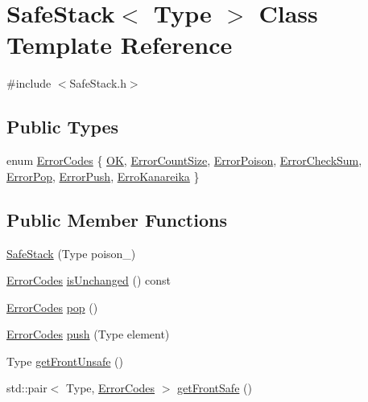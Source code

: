 \hypertarget{classSafeStack}{}\section{Safe\+Stack$<$ Type $>$ Class Template Reference}
\label{classSafeStack}


{\ttfamily \#include $<$Safe\+Stack.\+h$>$}

\subsection*{Public Types}
\begin{DoxyCompactItemize}
\item 
enum \hyperlink{classSafeStack_a3a6ee072918bd0a2c09fa0ea12c1ab64}{Error\+Codes} \{ \newline
\hyperlink{classSafeStack_a3a6ee072918bd0a2c09fa0ea12c1ab64a93f2888c3bca456c946b0ccab748c528}{OK}, 
\hyperlink{classSafeStack_a3a6ee072918bd0a2c09fa0ea12c1ab64a0c945d7ee858c618581c0880fa9c90ec}{Error\+Count\+Size}, 
\hyperlink{classSafeStack_a3a6ee072918bd0a2c09fa0ea12c1ab64a1dae85291dc4c12d33f7a19f5691428b}{Error\+Poison}, 
\hyperlink{classSafeStack_a3a6ee072918bd0a2c09fa0ea12c1ab64ab01666e8811782433f76bb840a9546db}{Error\+Check\+Sum}, 
\newline
\hyperlink{classSafeStack_a3a6ee072918bd0a2c09fa0ea12c1ab64ad5ec78a91bea5a0c4287a33bf641694d}{Error\+Pop}, 
\hyperlink{classSafeStack_a3a6ee072918bd0a2c09fa0ea12c1ab64a604e5836364af75dcb5fadf5b8bb158d}{Error\+Push}, 
\hyperlink{classSafeStack_a3a6ee072918bd0a2c09fa0ea12c1ab64a4b7d6f3ca4bc8af6d813a8e9b97f1592}{Erro\+Kanareika}
 \}
\end{DoxyCompactItemize}
\subsection*{Public Member Functions}
\begin{DoxyCompactItemize}
\item 
\hyperlink{classSafeStack_a09eef1ed7a4e2b0486d4991bc23ea78f}{Safe\+Stack} (Type poison\+\_\+)
\item 
\hyperlink{classSafeStack_a3a6ee072918bd0a2c09fa0ea12c1ab64}{Error\+Codes} \hyperlink{classSafeStack_a6ba7568bccbbd336aa7f6ee6102cd411}{is\+Unchanged} () const
\item 
\hyperlink{classSafeStack_a3a6ee072918bd0a2c09fa0ea12c1ab64}{Error\+Codes} \hyperlink{classSafeStack_a7add18e30f467b9b08233feeed6544df}{pop} ()
\item 
\hyperlink{classSafeStack_a3a6ee072918bd0a2c09fa0ea12c1ab64}{Error\+Codes} \hyperlink{classSafeStack_a4ecd17feae41fe142535f281a80a6a6c}{push} (Type element)
\item 
Type \hyperlink{classSafeStack_ad3ebe85bc788378690144800418e761d}{get\+Front\+Unsafe} ()
\item 
std\+::pair$<$ Type, \hyperlink{classSafeStack_a3a6ee072918bd0a2c09fa0ea12c1ab64}{Error\+Codes} $>$ \hyperlink{classSafeStack_a5b4c56ff55c462bd746f4f36258d46e0}{get\+Front\+Safe} ()
\end{DoxyCompactItemize}
